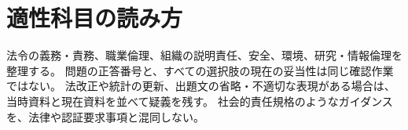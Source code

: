 \chapter{適性科目の読み方}
法令の義務・責務、職業倫理、組織の説明責任、安全、環境、研究・情報倫理を整理する。
問題の正答番号と、すべての選択肢の現在の妥当性は同じ確認作業ではない。
法改正や統計の更新、出題文の省略・不適切な表現がある場合は、当時資料と現在資料を並べて疑義を残す。
社会的責任規格のようなガイダンスを、法律や認証要求事項と混同しない。
